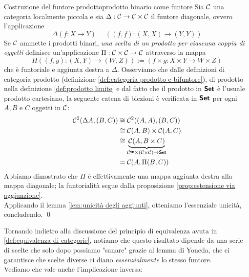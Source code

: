 \documentclass[openany]{book}
\renewcommand\C{\mc{C}}
\begin{document}
\begin{theorem}{Costruzione del funtore prodotto}{prodotto binario come funtore}
    Sia $\C$ una categoria localmente piccola e sia $\Delta :\C\to\C\times\C$ il funtore diagonale, ovvero l'applicazione
    \[ \Delta( f:X\to Y ) = ((f,f):(X,X)\to(Y,Y))\]
    Se $\C$ ammette i prodotti binari, \textit{una scelta di un prodotto per ciascuna coppia di oggetti} definisce un'applicazione $\Pi : \C\times\C \to \C$ attraverso la mappa
    \[\Pi((f,g):(X,Y)\to(W,Z)) := (f\times  g : X\times Y \to W\times Z) \]
    che è funtoriale e aggiunta destra a $\Delta$.
    \proof
    Osserviamo che dalle definizioni di categoria prodotto (definizione \cref{def:categoria prodotto e bifuntore}), di prodotto nella definizione \cref{def:prodotto limite} e dal fatto che il prodotto in $\text{\sffamily\textbf{Set}}$ è l'usuale prodotto cartesiano, la seguente catena di biezioni è verificata in $\text{\sffamily\textbf{Set}}$ per ogni $A,B$ e $C$ oggetti in $\C$:
    \[\begin{aligned}
        \C^2(\Delta A,(B,C)) & \cong \C^2((A,A),(B,C))\\
        & \cong \C(A,B)\times \C(A,C)\\
        & \cong \underbrace{\C(A, B\times C)}_{\C^\op \times (\C\times\C) \to \setcat} \\
        & = \C(A,\Pi(B,C))
    \end{aligned} \]
    Abbiamo dimostrato che $\Pi$ è effettivamente una mappa aggiunta destra alla mappa diagonale; la funtorialità segue dalla proposizione \cref{prop:estensione via aggiunzione}.\\
    Applicando il lemma \cref{lem:unicità degli aggiunti}, otteniamo l'essenziale unicità, concludendo.
    \qed
\end{theorem}

Tornando indietro alla discussione del principio di equivalenza avuta in \cref{def:equivalenza di categorie}, notiamo che questo risultato dipende da una serie di scelte che solo dopo possiamo "sanare" grazie al lemma di Yoneda, che ci garantisce che scelte diverse ci diano \textit{essenzialmente} lo stesso funtore.\\
Vediamo che vale anche l'implicazione inversa:
\end{document}

